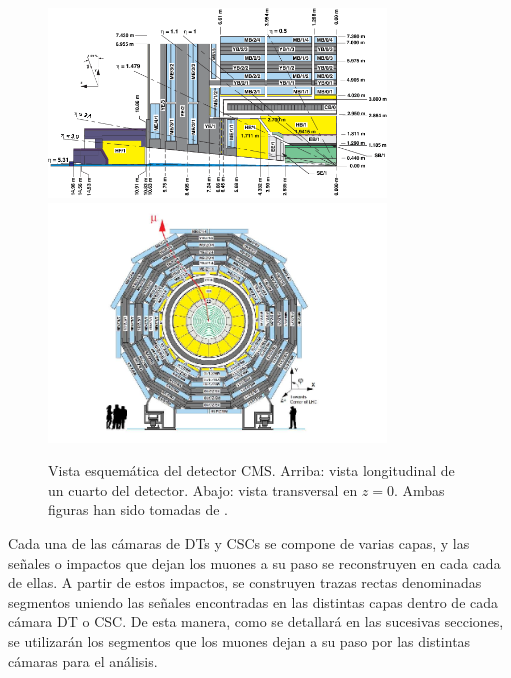 \begin{figure}
\centering
\includegraphics[width=0.8\textwidth]{figures/CMSview1.png}
\includegraphics[width=0.8\textwidth]{figures/CMSview.png}
\caption{Vista esquem\'atica del detector CMS. Arriba: vista longitudinal de un cuarto del detector. Abajo: vista transversal en $z = 0$. Ambas figuras han sido tomadas de \cite{DTperformance}.}
\label{fig:CMSsub}
\end{figure}


Cada una de las c\'amaras de DTs y CSCs se compone de varias capas, y las se\~nales o impactos que dejan los muones a su paso se reconstruyen en cada cada de ellas. A partir de estos impactos, se construyen trazas rectas denominadas segmentos uniendo las se\~nales encontradas en las distintas capas dentro de cada c\'amara DT o CSC. De esta manera, como se detallar\'a en las sucesivas secciones, se utilizar\'an los segmentos que los muones dejan a su paso por las distintas c\'amaras para el an\'alisis.

\clearpage
